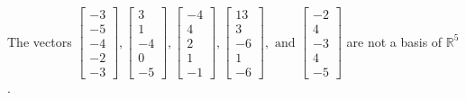\begin{exercise}
\begin{exerciseStatement}
  \end{exerciseStatement}
  \begin{exerciseAnswer}
   The vectors \(\left[\begin{array}{r}
-3 \\
-5 \\
-4 \\
-2 \\
-3
\end{array}\right] , \left[\begin{array}{r}
3 \\
1 \\
-4 \\
0 \\
-5
\end{array}\right] , \left[\begin{array}{r}
-4 \\
4 \\
2 \\
1 \\
-1
\end{array}\right] , \left[\begin{array}{r}
13 \\
3 \\
-6 \\
1 \\
-6
\end{array}\right] , \text{ and } \left[\begin{array}{r}
-2 \\
4 \\
-3 \\
4 \\
-5
\end{array}\right]\) 
  	 are not  a basis of \(\mathbb{R}^5\).
  


  \end{exerciseAnswer}
\end{exercise}